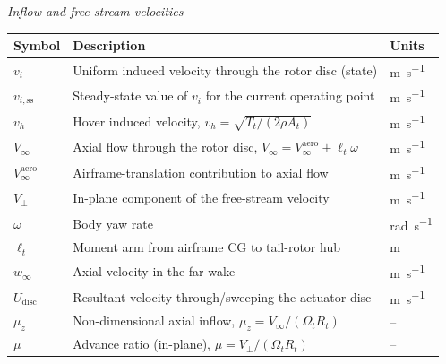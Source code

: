 \documentclass[11pt,a4paper]{article}
\newcommand{\OmegaT}{\Omega_t}
\newcommand{\Rt}{R_t}
\newcommand{\At}{A_t}
\newcommand{\Tt}{T_t}
\newcommand{\vi}{v_i}
\newcommand{\viss}{v_{i,\text{ss}}}
\begin{document}
\vspace{0.5em}
\noindent\textit{Inflow and free-stream velocities}
\begin{center}
\renewcommand{\arraystretch}{1.12}
\begin{tabular}{@{}l l l@{}}
\toprule
Symbol & Description & Units \\
\midrule
\(\vi\)         & Uniform induced velocity through the rotor disc (state) & \si{\metre\per\second}\\
\(\viss\)       & Steady-state value of \(\vi\) for the current operating point & \si{\metre\per\second}\\
\(v_h\)         & Hover induced velocity, \(v_h=\sqrt{\Tt/(2\rho\At)}\) & \si{\metre\per\second}\\
\(V_\infty\)    & Axial flow through the rotor disc, \(V_\infty=V_\infty^{\text{aero}}+\ell_t\omega\) & \si{\metre\per\second}\\
\(V_\infty^{\text{aero}}\) & Airframe-translation contribution to axial flow & \si{\metre\per\second}\\
\(V_\perp\)     & In-plane component of the free-stream velocity         & \si{\metre\per\second}\\
\(\omega\)    & Body yaw rate                                          & \si{\radian\per\second}\\
\(\ell_t\)      & Moment arm from airframe CG to tail-rotor hub          & \si{\metre}\\
\(w_\infty\)   & Axial velocity in the far wake                         & \si{\metre\per\second}\\
\(U_{\text{disc}}\) & Resultant velocity through/sweeping the actuator disc & \si{\metre\per\second}\\
\(\mu_z\)       & Non-dimensional axial inflow, \(\mu_z = V_\infty/(\OmegaT\Rt)\) & --\\
\(\mu\)         & Advance ratio (in-plane), \(\mu = V_\perp/(\OmegaT\Rt)\) & --\\
\bottomrule
\end{tabular}
\end{center}
\end{document}
